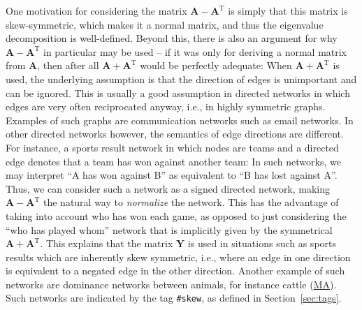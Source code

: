 \documentclass{article}
\begin{document}
One motivation for considering the matrix $\mathbf A - \mathbf
A^{\mathrm T}$ is simply that this matrix is skew-symmetric, which makes
it a normal matrix, and thus the eigenvalue decomposition is
well-defined.  Beyond this, there is also an argument for why $\mathbf A
- \mathbf A^{\mathrm T}$ in particular may be used -- if it was only for
deriving a normal matrix from $\mathbf A$, then after all $\mathbf A +
\mathbf A^{\mathrm T}$ would be perfectly adequate:  When $\mathbf A +
\mathbf A^{\mathrm T}$ is used, the underlying assumption is that the
direction of edges is unimportant and can be ignored.  This is usually a
good assumption in directed networks in which edges are very often
reciprocated anyway, i.e., in highly symmetric graphs.  Examples of such
graphs are communication networks such as email networks.  In other
directed networks however, the semantics of edge directions are
different.  For instance, a sports result network in which nodes are
teams and a directed edge denotes that a team has won against another
team:  In such networks, we may interpret ``A has won against B'' as
equivalent to ``B has lost against A''.  Thus, we can consider such a
network as a signed directed network, making $\mathbf A - \mathbf
A^{\mathrm T}$ the natural way to \emph{normalize} the network.  This
has the advantage of taking into account who has won each game, as
opposed to just considering the ``who has played whom'' network that is
implicitly given by the symmetrical $\mathbf A + \mathbf A^{\mathrm
  T}$.  This explains that the matrix $\mathbf Y$ is used in situations
such as sports results which are inherently skew symmetric, i.e., where
an edge in one direction is equivalent to a negated edge in the other
direction.  Another example of such networks are dominance networks
between animals, for instance cattle
(\href{http://konect.cc/networks/moreno_cattle/}{\textsf{MA}}).  Such
networks are indicated by the tag \texttt{\#skew}, as defined in
Section~\ref{sec:tags}. 
\end{document}

